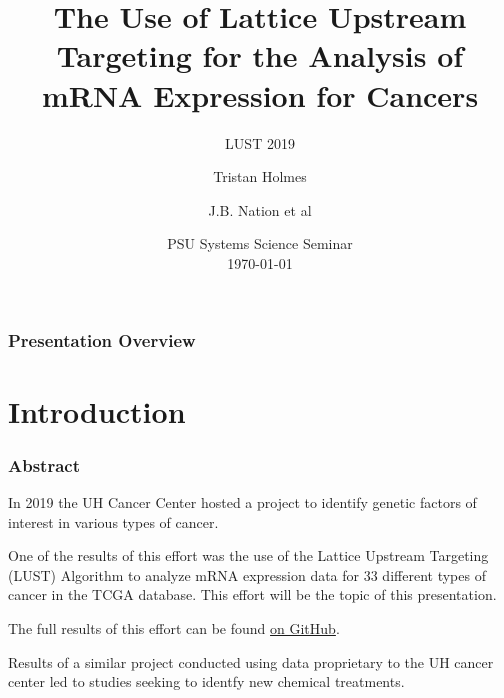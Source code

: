 \documentclass[
	11pt, %
]{beamer}
\title[LUST 2019]{The Use of Lattice Upstream Targeting for the Analysis of mRNA Expression for Cancers} %
\subtitle{LUST 2019} %
\author[Holmes \and Nation et al]{Tristan Holmes \and J.B. Nation et al} %
\institute[UH]{University of Hawaii at Manoa \\ \smallskip \textit{tristanh314@gmail.com}} %
\date[\today]{PSU Systems Science Seminar\\ \today} %
\begin{document}

\begin{frame}
	\titlepage
\end{frame}



\begin{frame}
	\frametitle{Presentation Overview}
	
	\tableofcontents
\end{frame}


\section{Introduction} 

\begin{frame}
	\frametitle{Abstract}
	
	In 2019 the UH Cancer Center hosted a project to identify genetic factors of interest in various types of cancer.
	
	\bigskip 

	One of the results of this effort was the use of the Lattice Upstream Targeting (LUST) Algorithm to analyze mRNA expression data for 33 different types of cancer in the TCGA database. This effort will be the topic of this presentation.
	
    \bigskip

    The full results of this effort can be found \href{https://github.com/tristanh314/lust-cancer-2019}{on GitHub}.

	\bigskip 

    Results of a similar project conducted using data proprietary to the UH cancer center led to studies seeking to identfy new chemical treatments.
\end{frame}
\end{document}
